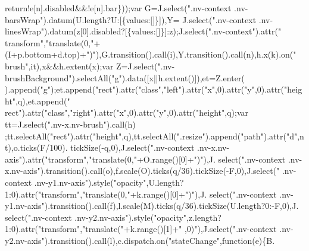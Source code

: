 \begin{DoxyCode}
{{      return}!e[n].disabled&&!e[n].bar\}));var G=J.select(\textcolor{stringliteral}{".nv-context .nv-barsWrap"}).datum(U.length?U:[\{values:[]\}]),Y=
      J.select(\textcolor{stringliteral}{".nv-context .nv-linesWrap"}).datum(z[0].disabled?[\{values:[]\}]:z);J.select(\textcolor{stringliteral}{".nv-context"}).attr(\textcolor{stringliteral}{"
      transform"},\textcolor{stringliteral}{"translate(0,"}+(I+p.bottom+d.top)+\textcolor{stringliteral}{")"}),G.transition().call(i),Y.transition().call(n),h.x(k).on(\textcolor{stringliteral}{"
      brush"},it),x&&h.extent(x);var Z=J.select(\textcolor{stringliteral}{".nv-brushBackground"}).selectAll(\textcolor{stringliteral}{"g"}).data([x||h.extent()]),et=Z.enter(
      ).append(\textcolor{stringliteral}{"g"});et.append(\textcolor{stringliteral}{"rect"}).attr(\textcolor{stringliteral}{"class"},\textcolor{stringliteral}{"left"}).attr(\textcolor{stringliteral}{"x"},0).attr(\textcolor{stringliteral}{"y"},0).attr(\textcolor{stringliteral}{"height"},q),et.append(\textcolor{stringliteral}{"
      rect"}).attr(\textcolor{stringliteral}{"class"},\textcolor{stringliteral}{"right"}).attr(\textcolor{stringliteral}{"x"},0).attr(\textcolor{stringliteral}{"y"},0).attr(\textcolor{stringliteral}{"height"},q);var tt=J.select(\textcolor{stringliteral}{".nv-x.nv-brush"}).call(h)
      ;tt.selectAll(\textcolor{stringliteral}{"rect"}).attr(\textcolor{stringliteral}{"height"},q),tt.selectAll(\textcolor{stringliteral}{".resize"}).append(\textcolor{stringliteral}{"path"}).attr(\textcolor{stringliteral}{"d"},nt),o.ticks(F/100).
      tickSize(-q,0),J.select(\textcolor{stringliteral}{".nv-context .nv-x.nv-axis"}).attr(\textcolor{stringliteral}{"transform"},\textcolor{stringliteral}{"translate(0,"}+O.range()[0]+\textcolor{stringliteral}{")"}),J.
      select(\textcolor{stringliteral}{".nv-context .nv-x.nv-axis"}).transition().call(o),f.scale(O).ticks(q/36).tickSize(-F,0),J.select(\textcolor{stringliteral}{"
      .nv-context .nv-y1.nv-axis"}).style(\textcolor{stringliteral}{"opacity"},U.length?1:0).attr(\textcolor{stringliteral}{"transform"},\textcolor{stringliteral}{"translate(0,"}+k.range()[0]+\textcolor{stringliteral}{")"}),J.
      select(\textcolor{stringliteral}{".nv-context .nv-y1.nv-axis"}).transition().call(f),l.scale(M).ticks(q/36).tickSize(U.length?0:-F,0),J.
      select(\textcolor{stringliteral}{".nv-context .nv-y2.nv-axis"}).style(\textcolor{stringliteral}{"opacity"},z.length?1:0).attr(\textcolor{stringliteral}{"transform"},\textcolor{stringliteral}{"translate("}+k.range()[1]+\textcolor{stringliteral}{"
      ,0)"}),J.select(\textcolor{stringliteral}{".nv-context .nv-y2.nv-axis"}).transition().call(l),c.dispatch.on(\textcolor{stringliteral}{"stateChange"},\textcolor{keyword}{function}(e)\{B.
}
\end{DoxyCode}
